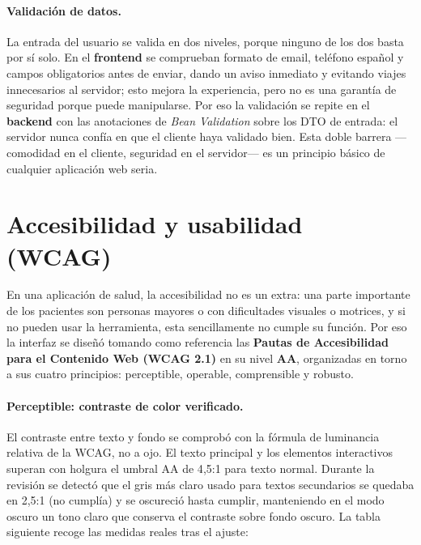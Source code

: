 \documentclass[12pt,a4paper]{report}
\begin{document}
\paragraph{Validación de datos.} La entrada del usuario se valida en dos niveles, porque ninguno de los dos basta por sí solo. En el \textbf{frontend} se comprueban formato de email, teléfono español y campos obligatorios antes de enviar, dando un aviso inmediato y evitando viajes innecesarios al servidor; esto mejora la experiencia, pero no es una garantía de seguridad porque puede manipularse. Por eso la validación se repite en el \textbf{backend} con las anotaciones de \emph{Bean Validation} sobre los DTO de entrada: el servidor nunca confía en que el cliente haya validado bien. Esta doble barrera —comodidad en el cliente, seguridad en el servidor— es un principio básico de cualquier aplicación web seria.

\section{Accesibilidad y usabilidad (WCAG)}

En una aplicación de salud, la accesibilidad no es un extra: una parte importante de los pacientes son personas mayores o con dificultades visuales o motrices, y si no pueden usar la herramienta, esta sencillamente no cumple su función. Por eso la interfaz se diseñó tomando como referencia las \textbf{Pautas de Accesibilidad para el Contenido Web (WCAG 2.1)} en su nivel \textbf{AA}, organizadas en torno a sus cuatro principios: perceptible, operable, comprensible y robusto.

\paragraph{Perceptible: contraste de color verificado.} El contraste entre texto y fondo se comprobó con la fórmula de luminancia relativa de la WCAG, no a ojo. El texto principal y los elementos interactivos superan con holgura el umbral AA de 4{,}5:1 para texto normal. Durante la revisión se detectó que el gris más claro usado para textos secundarios se quedaba en 2{,}5:1 (no cumplía) y se oscureció hasta cumplir, manteniendo en el modo oscuro un tono claro que conserva el contraste sobre fondo oscuro. La tabla siguiente recoge las medidas reales tras el ajuste:
\end{document}
